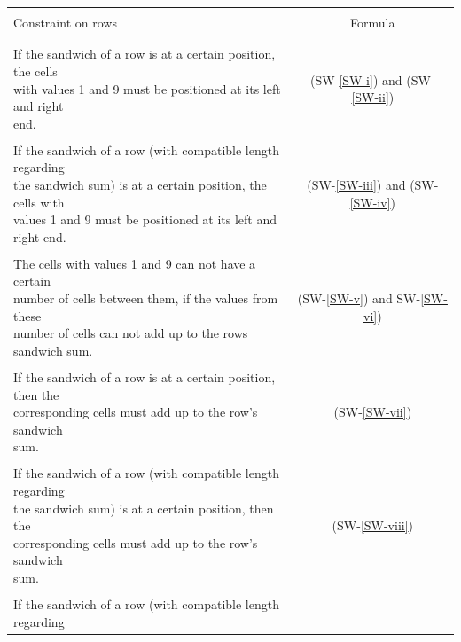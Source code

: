 \begin{table}
    \centering
    \begin{tabular*}{\textwidth}{l @{\extracolsep{\fill}} c}
        \hline
        \\
        Constraint on rows & Formula\\
        \\
        \hline
        \\
        \makecell[cl]{If the sandwich of a row is at a certain position, the cells\\
        with values 1 and 9 must be positioned at its left and right\\
        end.} & (SW-\ref{SW-i}) and (SW-\ref{SW-ii})\\
        \\
        \makecell[cl]{If the sandwich of a row (with compatible length regarding\\
        the sandwich sum) is at a certain position, the cells with\\
        values 1 and 9 must be positioned at its left and right end.} & (SW-\ref{SW-iii}) and (SW-\ref{SW-iv})\\
        \\
        \makecell[cl]{The cells with values 1 and 9 can not have a certain\\
        number of cells between them, if the values from these\\
        number of cells can not add up to the rows sandwich sum.} & (SW-\ref{SW-v}) and SW-\ref{SW-vi})\\
        \\
        \makecell[cl]{If the sandwich of a row is at a certain position, then the\\
        corresponding cells must add up to the row's sandwich\\
        sum.} & (SW-\ref{SW-vii})\\
        \\
        \makecell[cl]{If the sandwich of a row (with compatible length regarding\\
        the sandwich sum) is at a certain position, then the\\
        corresponding cells must add up to the row's sandwich\\
        sum.} & (SW-\ref{SW-viii})\\
        \\
        \makecell[cl]{If the sandwich of a row (with compatible length regarding\\
}
\end{tabular*}
\end{table}
